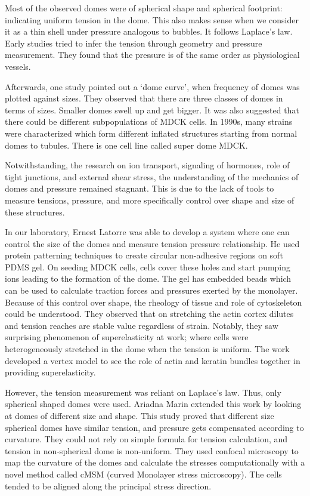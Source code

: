 \documentclass[
]{article}
\begin{document}
Most of the observed domes were of spherical shape and spherical
footprint: indicating uniform tension in the dome. This also makes sense
when we consider it as a thin shell under pressure analogous to bubbles.
It follows Laplace's law. Early studies tried to infer the tension
through geometry and pressure measurement. They found that the pressure
is of the same order as physiological vessels.

Afterwards, one study pointed out a `dome curve', when frequency of
domes was plotted against sizes. They observed that there are three
classes of domes in terms of sizes. Smaller domes swell up and get
bigger. It was also suggested that there could be different
subpopulations of MDCK cells. In 1990s, many strains were characterized
which form different inflated structures starting from normal domes to
tubules. There is one cell line called super dome MDCK.

Notwithstanding, the research on ion transport, signaling of hormones,
role of tight junctions, and external shear stress, the understanding of
the mechanics of domes and pressure remained stagnant. This is due to
the lack of tools to measure tensions, pressure, and more specifically
control over shape and size of these structures.

In our laboratory, Ernest Latorre was able to develop a system where one
can control the size of the domes and measure tension pressure
relationship. He used protein patterning techniques to create circular
non-adhesive regions on soft PDMS gel. On seeding MDCK cells, cells
cover these holes and start pumping ions leading to the formation of the
dome. The gel has embedded beads which can be used to calculate traction
forces and pressures exerted by the monolayer. Because of this control
over shape, the rheology of tissue and role of cytoskeleton could be
understood. They observed that on stretching the actin cortex dilutes
and tension reaches are stable value regardless of strain. Notably, they
saw surprising phenomenon of superelasticity at work; where cells were
heterogeneously stretched in the dome when the tension is uniform. The
work developed a vertex model to see the role of actin and keratin
bundles together in providing superelasticity.

However, the tension measurement was reliant on Laplace's law. Thus,
only spherical shaped domes were used. Ariadna Marin extended this work
by looking at domes of different size and shape. This study proved that
different size spherical domes have similar tension, and pressure gets
compensated according to curvature. They could not rely on simple
formula for tension calculation, and tension in non-spherical dome is
non-uniform. They used confocal microscopy to map the curvature of the
domes and calculate the stresses computationally with a novel method
called cMSM (curved Monolayer stress microscopy). The cells tended to be
aligned along the principal stress direction.
\end{document}
